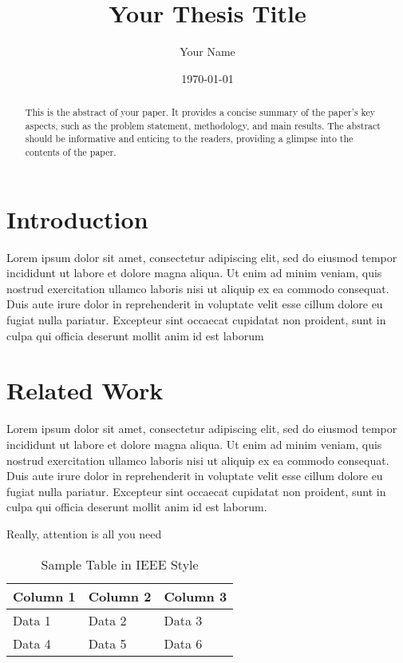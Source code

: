 \documentclass[conference]{IEEEtran}
\title{Your Thesis Title}
\author{Your Name}
\date{\today}
\begin{document}
	
	\maketitle
	\begin{abstract}
		This is the abstract of your paper. It provides a concise summary of the paper's key aspects, such as the problem statement, methodology, and main results. The abstract should be informative and enticing to the readers, providing a glimpse into the contents of the paper.
	\end{abstract}
	
	\section{Introduction}
	Lorem ipsum dolor sit amet, consectetur adipiscing elit, sed do eiusmod tempor incididunt ut labore et dolore magna aliqua. Ut enim ad minim veniam, quis nostrud exercitation ullamco laboris nisi ut aliquip ex ea commodo consequat. Duis aute irure dolor in reprehenderit in voluptate velit esse cillum dolore eu fugiat nulla pariatur. Excepteur sint occaecat cupidatat non proident, sunt in culpa qui officia deserunt mollit anim id est laborum
	
	\section{Related Work}
	Lorem ipsum dolor sit amet, consectetur adipiscing elit, sed do eiusmod tempor incididunt ut labore et dolore magna aliqua. Ut enim ad minim veniam, quis nostrud exercitation ullamco laboris nisi ut aliquip ex ea commodo consequat. Duis aute irure dolor in reprehenderit in voluptate velit esse cillum dolore eu fugiat nulla pariatur. Excepteur sint occaecat cupidatat non proident, sunt in culpa qui officia deserunt mollit anim id est laborum.
	
	Really, attention is all you need  \cite{vaswani2017attention}
	
\begin{table}[htbp]
	\centering
	\caption{Sample Table in IEEE Style}
	\label{tab:sample}
	\begin{tabularx}{\columnwidth}{|X|X|X|}
		\hline
		\textbf{Column 1} & \textbf{Column 2} & \textbf{Column 3} \\
		\hline
		Data 1 & Data 2 & Data 3 \\
		\hline
		Data 4 & Data 5 & Data 6 \\
		\hline
	\end{tabularx}
\end{table}
	
\end{document}
